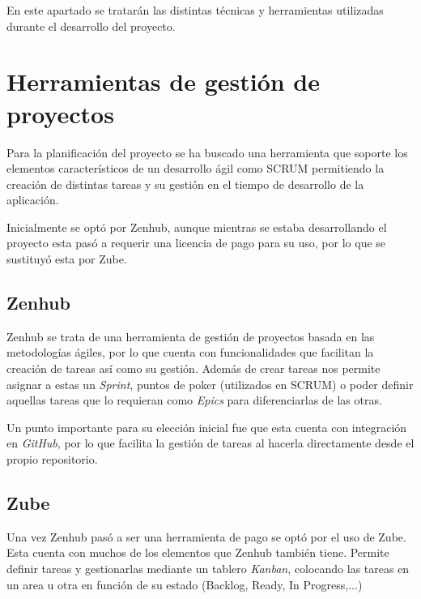
En este apartado se tratarán las distintas técnicas y herramientas utilizadas durante el desarrollo
del proyecto.

\section{Herramientas de gestión de proyectos}
Para la planificación del proyecto se ha buscado una herramienta que soporte
los elementos característicos de un desarrollo ágil como SCRUM permitiendo la creación
de distintas tareas y su gestión en el tiempo de desarrollo de la aplicación. 

Inicialmente se optó por Zenhub, aunque mientras se estaba desarrollando el proyecto
esta pasó a requerir una licencia de pago para su uso, por lo que se sustituyó esta
por Zube.

\subsection{Zenhub}
Zenhub se trata de una herramienta de gestión de proyectos basada en las metodologías
ágiles, por lo que cuenta con funcionalidades que facilitan la creación de tareas así como su gestión.
Además de crear tareas nos permite asignar a estas un \textit{Sprint}, puntos de poker (utilizados en SCRUM)
o poder definir aquellas tareas que lo requieran como \textit{Epics} para diferenciarlas de las otras.


Un punto importante para su elección inicial fue que esta cuenta con integración en \textit{GitHub},
por lo que facilita la gestión de tareas al hacerla directamente desde el propio repositorio.
\subsection{Zube}
Una vez Zenhub pasó a ser una herramienta de pago se optó por el uso de Zube. Esta cuenta con muchos
de los elementos que Zenhub también tiene. Permite definir tareas y gestionarlas mediante un tablero \textit{Kanban},
colocando las tareas en un area u otra en función de su estado (Backlog, Ready, In Progress,...)

